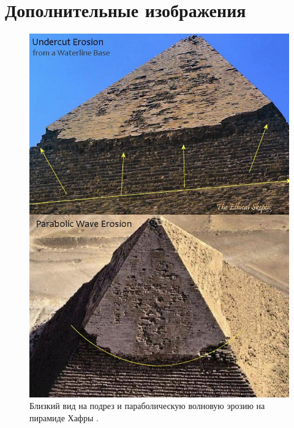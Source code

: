 \documentclass[10pt,twocolumn,letterpaper]{article}
\begin{document}
\clearpage
\twocolumn

\section{Дополнительные изображения}


\begin{figure}[H]
\begin{center}
   \includegraphics[width=1\linewidth]{wave.jpg}
\end{center}
   \caption{Близкий вид на подрез и параболическую волновую эрозию на пирамиде Хафры \cite{27}.}
\label{fig:19}
\label{fig:onecol}
\end{figure}
\end{document}
